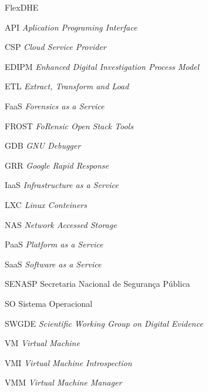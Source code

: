 \documentclass[a4paper,capchap,espacoduplo,normaltoc]{abntepusp}
\newcommand{\hash}{\mathcal{H}}
\newcommand{\bigO}{\mathcal{O}}
\begin{document}
\listoffigures
\listoftables

\begin{listofabbrv}{FlexDHE}
    \item [API] \textit{Aplication Programing Interface}
    \item [CSP] \textit{Cloud Service Provider}
    \item [EDIPM] \textit{Enhanced Digital Investigation Process Model}
    \item [ETL] \textit{Extract, Transform and Load}
    \item [FaaS] \textit{Forensics as a Service}
    \item [FROST] \textit{FoRensic Open Stack Tools} 
    \item [GDB] \textit{GNU Debugger}
    \item [GRR] \textit{Google Rapid Response}
    \item [IaaS] \textit{Infrastructure as a Service}
    \item [LXC] \textit{Linux Conteiners}
    \item [NAS] \textit{Network Accessed Storage}
    \item [PaaS] \textit{Platform as a Service}
    \item [SaaS] \textit{Software as a Service}
    \item [SENASP] Secretaria Nacional de Segurança Pública
    \item [SO] Sistema Operacional
    \item [SWGDE] \textit{Scientific Working Group on Digital Evidence}
    \item [VM] \textit{Virtual Machine}
    \item [VMI] \textit{Virtual Machine Introspection}
    \item [VMM] \textit{Virtual Machine Manager}
\end{listofabbrv}



\tableofcontents










\appendix

%
\end{document}
